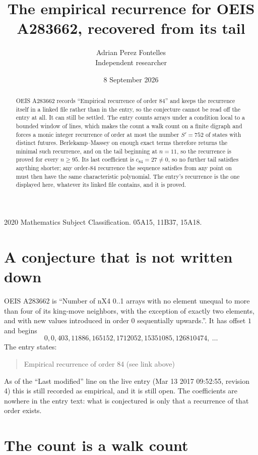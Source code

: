 \documentclass[11pt,a4paper]{article}
\title{The empirical recurrence for OEIS A283662, recovered from its tail}
\author{Adrian Perez Fontelles\\ \small Independent researcher}
\date{8 September 2026}
\theoremstyle{plain}
\theoremstyle{definition}
\begin{document}
\maketitle

\begin{abstract}
OEIS A283662 records ``Empirical recurrence of order $84$'' and keeps the recurrence itself in
a linked file rather than in the entry, so the conjecture cannot be read off the entry at all.
It can still be settled. The entry counts arrays under a condition local to a bounded window of
lines, which makes the count a walk count on a finite digraph and forces a monic integer
recurrence of order at most the number $S'=752$ of states with distinct futures. Berlekamp--Massey on
enough exact terms therefore returns the minimal such recurrence, and on the tail beginning at $n=11$, so the recurrence is proved for every $n\ge95$.
Its last coefficient is $c_{84}=27\neq0$, so no further tail satisfies anything
shorter; any order-$84$ recurrence the sequence satisfies from any point on must then have
the same characteristic polynomial. The entry's recurrence is the one displayed here, whatever
its linked file contains, and it is proved.
\end{abstract}

\noindent\small 2020 Mathematics Subject Classification. 05A15, 11B37, 15A18.\normalsize

\section{A conjecture that is not written down}

OEIS A283662 is ``Number of nX4 0..1 arrays with no element unequal to more than four of its king-move neighbors, with the exception of exactly two elements, and with new values introduced in order 0 sequentially upwards.''. It has offset $1$ and begins
\[
0, 0, 403, 11886, 165152, 1712052, 15351085, 126810474,\ \dots
\]
The entry states:
\begin{quote}
Empirical recurrence of order 84 (see link above)
\end{quote}
As of the ``Last modified'' line on the live entry (Mar 13 2017 09:52:55, revision 4)
this is still recorded as empirical, and it is still open. The coefficients are nowhere in the
entry text: what is conjectured is only that a recurrence of that order exists.

\section{The count is a walk count}
\end{document}
